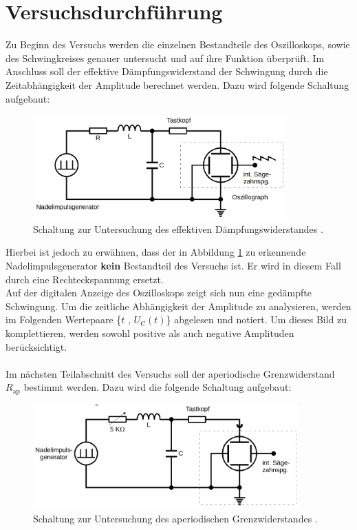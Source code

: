 


\section{Versuchsdurchführung}

Zu Beginn des Versuchs werden die einzelnen Bestandteile des Oszilloskops, sowie des Schwingkreises genauer untersucht 
und auf ihre Funktion überprüft. Im Anschluss soll der effektive Dämpfungswiderstand der Schwingung durch die 
Zeitabhängigkeit der Amplitude berechnet werden. Dazu wird folgende Schaltung aufgebaut:

\begin{figure}
    \centering
    \includegraphics[height=4cm]{5a.png}
    \caption{Schaltung zur Untersuchung des effektiven Dämpfungswiderstandes \cite{Versuchsanleitung_v354}.}
    \label{fig:5a}
\end{figure}

\noindent Hierbei ist jedoch zu erwähnen, dass der in Abbildung \ref{fig:5a} zu erkennende Nadelimpulsgenerator \textbf{kein}
Bestandteil des Versuchs ist. Er wird in diesem Fall durch eine Rechteckspannung ersetzt.\\
Auf der digitalen Anzeige des Oszilloskops zeigt sich nun eine gedämpfte Schwingung. Um die zeitliche Abhängigkeit der Amplitude 
zu analysieren, werden im Folgenden Wertepaare \{$t$ , $U_\text{C}(t)$\} abgelesen und notiert. Um dieses Bild zu komplettieren, 
werden sowohl positive als auch negative Amplituden berücksichtigt.\\\\

\noindent Im nächsten Teilabschnitt des Versuchs soll der aperiodische Grenzwiderstand $R_\text{ap}$ bestimmt werden. Dazu wird 
die folgende Schaltung aufgebaut:

\begin{figure}[H]
    \centering
    \includegraphics[height=4cm]{5b.png}
    \caption{Schaltung zur Untersuchung des aperiodischen Grenzwiderstandes \cite{Versuchsanleitung_v354}.}
    \label{fig:5b}
\end{figure}

